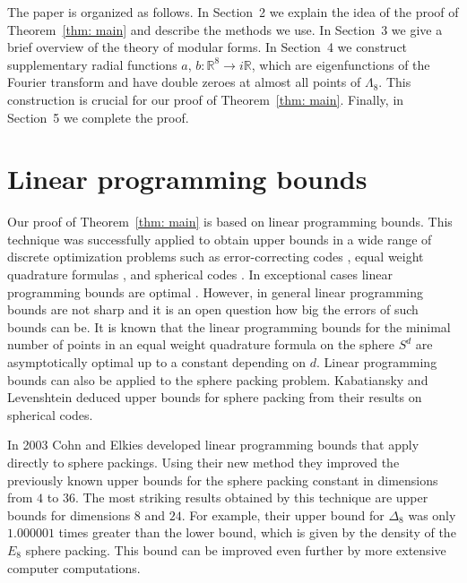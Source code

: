\documentclass{scrartcl}
\newcommand{\R}{\mathbb{R}}
\begin{document}
The paper is organized as follows. In Section~2 we explain the idea of the proof of Theorem~\ref{thm: main} and describe the methods we use. In Section~3 we give a brief overview of the theory of modular forms. In Section~4 we construct supplementary radial functions $a$, $b:\R^8\to i\R$, which are eigenfunctions of the Fourier transform and have double zeroes at almost all points of $\Lambda_8$. This construction is crucial for our proof of Theorem~\ref{thm: main}.  Finally, in Section~5 we complete the proof.





\section{Linear programming bounds}
 Our proof of Theorem~\ref{thm: main} is based on linear programming bounds. This technique was successfully applied to obtain upper bounds in a wide range of discrete optimization problems such as error-correcting codes \cite{Delsarte72}, equal weight quadrature formulas \cite{Delsarte77}, and spherical codes \cite{KabLev, PfenderZiegler}. In  exceptional cases linear programming bounds are optimal \cite{CohnKumar}. However, in general linear programming bounds are not sharp and it is an open question how big the errors of such bounds can be. It is known \cite{BRV} that the linear programming bounds for the minimal number of points in an equal weight quadrature formula on the sphere $S^d$ are asymptotically optimal up to a constant depending on $d$. Linear programming bounds can also be applied to the sphere packing problem. Kabatiansky and Levenshtein \cite{KabLev} deduced upper bounds for sphere packing from their results on spherical codes.

 In 2003 Cohn and Elkies \cite{ElkiesCohn}  developed  linear programming bounds that apply directly to sphere packings. Using their new method they improved the previously known upper bounds for the sphere packing constant in dimensions from $4$ to $36$. The most striking results obtained by this technique are upper bounds for dimensions $8$ and $24$. For example, their upper bound for $\Delta_8$ was only
$1.000001$ times greater than the lower bound, which is given by the density of the $E_8$ sphere packing. This bound can be improved even further by more extensive computer computations. %
\end{document}
